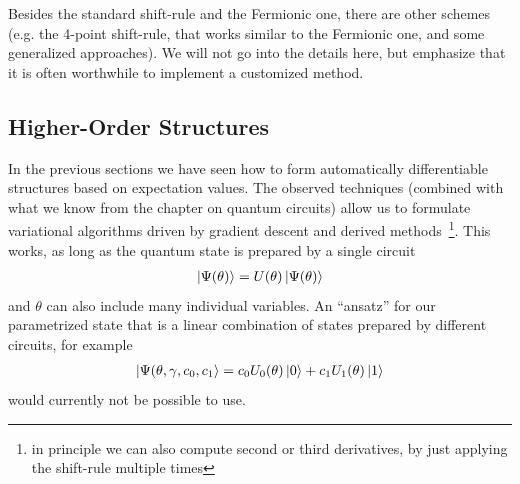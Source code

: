 Besides the standard shift-rule and the Fermionic one, there are other schemes (e.g. the 4-point shift-rule, that works similar to the Fermionic one, and some generalized approaches). We will not go into the details here, but emphasize that it is often worthwhile to implement a customized method. 

\subsection{Higher-Order Structures}
In the previous sections we have seen how to form automatically differentiable structures based on expectation values.
The observed techniques (combined with what we know from the chapter on quantum circuits) allow us to formulate variational algorithms driven by gradient descent and derived methods~\footnote{in principle we can also compute second or third derivatives, by just applying the shift-rule multiple times}.
This works, as long as the quantum state is prepared by a single circuit
\begin{align}
    \ket{\Psi(\theta)} = U(\theta) \ket{\Psi(\theta)}
\end{align}
and $\theta$ can also include many individual variables. 
An ``ansatz'' for our parametrized state that is a linear combination of states prepared by different circuits, for example
\begin{align}
    \ket{\Psi(\theta,\gamma,c_0,c_1} = c_0U_0(\theta)\ket{0} + c_1U_1(\theta)\ket{1}
\end{align}
would currently not be possible to use.

